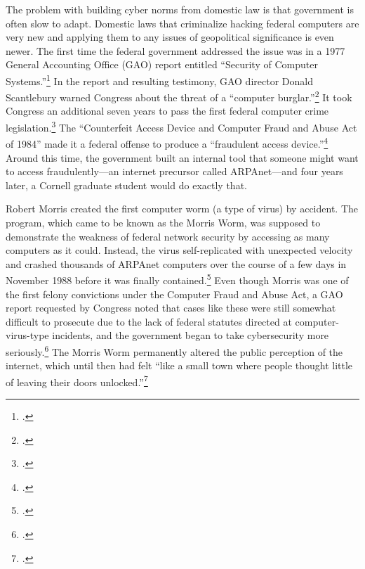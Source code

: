 \documentclass[11pt]{memoir}
\begin{document}
\begin{refsegment}
The problem with building cyber norms from domestic law is that government is often slow to adapt. Domestic laws that criminalize hacking federal computers are very new and applying them to any issues of geopolitical significance is even newer. The first time the federal government addressed the issue was in a 1977 General Accounting Office (GAO) report entitled ``Security of Computer Systems.''\footcite{washington_post_staff_timeline_2003} In the report and resulting testimony, GAO director Donald Scantlebury warned Congress about the threat of a ``computer burglar.''\footcite{u.s._government_accounting_office_security_1977} It took Congress an additional seven years to pass the first federal computer crime legislation.\footcite[The later bill cited here, the Computer Security Act of 1987, describes the 1984 bill as being the first federal legislation in this area.]{glickman_computer_1988} The ``Counterfeit Access Device and Computer Fraud and Abuse Act of 1984'' made it a federal offense to produce a ``fraudulent access device.''\footcite{hughes_access_1984} Around this time, the government built an internal tool that someone might want to access fraudulently---an internet precursor called ARPAnet---and four years later, a Cornell graduate student would do exactly that.

Robert Morris created the first computer worm (a type of virus) by accident. The program, which came to be known as the Morris Worm, was supposed to demonstrate the weakness of federal network security by accessing as many computers as it could. Instead, the virus self-replicated with unexpected velocity and crashed thousands of ARPAnet computers over the course of a few days in November 1988 before it was finally contained.\footcite[This source, a master's thesis for the USAF Air University, makes the dramatic and completely unsubstantiated claim that the Morris worm infected half of of ARPAnet's 88,000 computers. The more popular (and plausible) claim is that of the roughly 60,000 ARPAnet-connected computers, the worm infected 10\% of them, though that number is not particularly well substantiated either.]{moore_conception_2014} Even though Morris was one of the first felony convictions under the Computer Fraud and Abuse Act, a GAO report requested by Congress noted that cases like these were still somewhat difficult to prosecute due to the lack of federal statutes directed at computer-virus-type incidents, and the government began to take cybersecurity more seriously.\footcite{u._s._government_accounting_office_computer_1989} The Morris Worm permanently altered the public perception of the internet, which until then had felt ``like a small town where people thought little of leaving their doors unlocked.''\footcite{lee_how_2013}


\end{refsegment}
\end{document}
